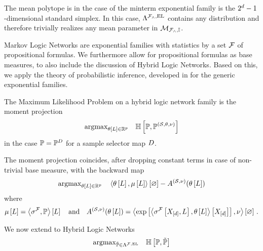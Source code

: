 \begin{example}
	The mean polytope is in the case of the minterm exponential family is the $2^d-1$-dimensional standard simplex.
	In this case, $\Lambda^{\mathcal{F}_{\land},\mathrm{EL}}$ contains any distribution and therefore trivially realizes any mean parameter in $\mathcal{M}_{\mathcal{F}_{\land},\mathbb{I}}$.
\end{example}



 \label{sec:parameterEstimation} %

Markov Logic Networks are exponential families with statistics by a set $\mathcal{F}$ of propositional formulas.
We furthermore allow for propositional formulas as base measures, to also include the discussion of Hybrid Logic Networks.
Based on this, we apply the theory of probabilistic inference, developed in  for the generic exponential families.


The Maximum Likelihood Problem on a hybrid logic network family is the moment projection
\begin{align*}
	\mathrm{argmax}_{\theta\left[L\right]\in\mathbb{R}^{p}} \quad
	\mathbb{H}\left[\mathbb{P},\mathbb{P}^{(\mathcal{S},\theta,\nu)}\right]
\end{align*}
in the case $\mathbb{P}=\mathbb{P}^{D}$ for a sample selector map $D$.

The moment projection coincides, after dropping constant terms in case of non-trivial base measure, with the backward map
\begin{align*}
	\mathrm{argmax}_{\theta\left[L\right]\in\mathbb{R}^{p}} \quad
	\left\langle \theta\left[L\right],\mu\left[L\right]\right\rangle \left[ \varnothing \right] - A^{(\mathcal{S},\nu)}(\theta\left[L\right])
\end{align*}
where
\begin{align*}
	\mu\left[L\right]
	= \left\langle \sigma^{\mathcal{F}},\mathbb{P}\right\rangle \left[ L \right]
	\quad \text{and} \quad
	A^{(\mathcal{S},\nu)}(\theta\left[L\right])
	= \left\langle \mathrm{exp}\left[ \left\langle \sigma^{\mathcal{F}}\left[X_{[d]},L\right],\theta\left[L\right]\right\rangle \left[ X_{[d]} \right] \right], \nu\right\rangle \left[ \varnothing \right] \, .
\end{align*}

We now extend to Hybrid Logic Networks
\begin{align*}
	\mathrm{argmax}_{\tilde{\mathbb{P}}\in\Lambda^{\mathcal{F},\mathrm{EL}}} \quad
	\mathbb{H}\left[\mathbb{P},\tilde{\mathbb{P}}\right]
\end{align*}



